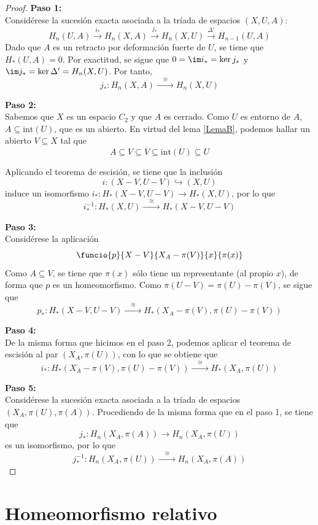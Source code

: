 \begin{proof} \textbf{Paso 1:}
\\
Considérese la sucesión exacta asociada a la tríada de espacios $(X,U,A)$: \[H_n(U,A) \xrightarrow{i_*} H_n(X,A) \xrightarrow{j_*} H_n(X,U) \xrightarrow{\Delta'} H_{n-1}(U,A)\] Dado que $A$ es un retracto por deformación fuerte de $U$, se tiene que $H_*(U,A)=0$. Por exactitud, se sigue que $0=\im i_*=\ker j_*$ y $\im j_*=\ker \Delta'=H_n(X,U)$. Por tanto, $$j_*: H_n(X,A) \xrightarrow{\quad\cong\quad} H_n(X,U)$$

\noindent\textbf{Paso 2:}
\\
Sabemos que $X$ es un espacio $C_2$ y que $A$ es cerrado. Como $U$ es entorno de $A$, $A \subseteq \mbox{int}(U)$, que es un abierto. En virtud del lema \ref{LemaB}, podemos hallar un abierto $V \subseteq X$ tal que $$A \subseteq V \subseteq \overline{V} \subseteq \mbox{int}(U) \subseteq U$$

Aplicando el teorema de escisión, se tiene que  la inclusión $$i: (X-V,U-V) \hookrightarrow (X,U)$$ induce un isomorfismo $i_*: H_*(X-V,U-V) \longrightarrow H_*(X,U)$, por lo que $$i_*^{-1}: H_*(X,U) \xrightarrow{\quad\cong\quad} H_*(X-V,U-V)$$

\noindent\textbf{Paso 3:}
\\
Considérese la aplicación $$\funcio{p}{X-V}{X_A-\pi(V)}{x}{\pi(x)}$$ Como $A \subseteq V$, se tiene que $\pi(x)$ sólo tiene un representante (al propio $x$), de forma que $p$ es un homeomorfismo. Como $\pi(U-V)=\pi(U)-\pi(V)$, se sigue que $$p_*: H_*(X-V,U-V) \xrightarrow{\quad\cong\quad} H_*(X_A-\pi(V),\pi(U)-\pi(V))$$

\noindent\textbf{Paso 4:}
\\
De la misma forma que hicimos en el paso 2, podemos aplicar el teorema de escisión al par $(X_A,\pi(U))$, con lo que se obtiene que $$i_*: H_*(X_A-\pi(V),\pi(U)-\pi(V)) \xrightarrow{\quad\cong\quad} H_*(X_A,\pi(U))$$

\noindent\textbf{Paso 5:}
\\
Considérese la sucesión exacta asociada a la tríada de espacios $(X_A,\pi(U),\pi(A))$. Procediendo de la misma forma que en el paso 1, se tiene que $$j_*: H_n(X_A,\pi(A)) \longrightarrow H_n(X_A,\pi(U))$$ es un isomorfismo, por lo que $$j_*^{-1}: H_n(X_A,\pi(U)) \xrightarrow{\quad\cong\quad} H_n(X_A,\pi(A))$$
\end{proof}

\section{Homeomorfismo relativo}

